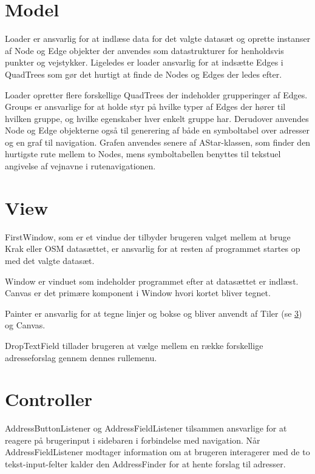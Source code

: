 \section{Model}
\label{sec:model}

Loader er ansvarlig for at indlæse data for det valgte datasæt og oprette instanser af Node og Edge objekter der anvendes som datastrukturer for henholdsvis punkter og vejstykker. Ligeledes er loader ansvarlig for at indsætte Edges i QuadTrees som gør det hurtigt at finde de Nodes og Edges der ledes efter.

Loader opretter flere forskellige QuadTrees der indeholder grupperinger af Edges. Groups er ansvarlige for at holde styr på hvilke typer af Edges der hører til hvilken gruppe, og hvilke egenskaber hver enkelt gruppe har. Derudover anvendes Node og Edge objekterne også til generering af både en symboltabel over adresser og en graf til navigation. Grafen anvendes senere af AStar-klassen, som finder den hurtigste rute mellem to Nodes, mens symboltabellen benyttes til tekstuel angivelse af vejnavne i rutenavigationen.
	
\section{View}
\label{sec:view}

FirstWindow, som er et vindue der tilbyder brugeren valget mellem at bruge Krak eller OSM datasættet, er ansvarlig for at resten af programmet startes op med det valgte datasæt.

Window er vinduet som indeholder programmet efter at datasættet er indlæst. Canvas er det primære komponent i Window hvori kortet bliver tegnet.

Painter er ansvarlig for at tegne linjer og bokse og bliver anvendt af Tiler (se \ref{sec:controller}) og Canvas.

DropTextField tillader brugeren at vælge mellem en række forskellige adresseforslag gennem dennes rullemenu.

\section{Controller}
\label{sec:controller}

AddressButtonListener og AddressFieldListener tilsammen ansvarlige for at reagere på brugerinput i sidebaren i forbindelse med navigation. Når AddressFieldListener modtager information om at brugeren interagerer med de to tekst-input-felter kalder den AddressFinder for at hente forslag til adresser.

